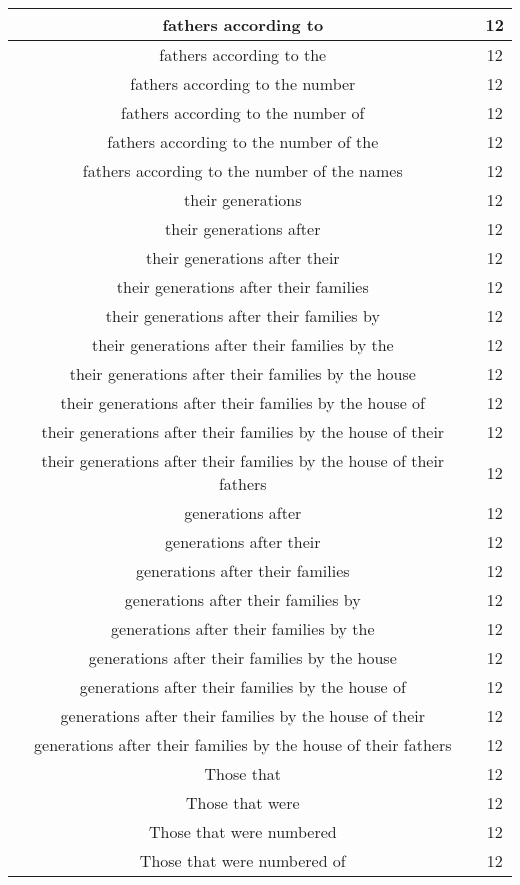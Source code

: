 \begin{center}
\begin{longtable}{|c|c|}
fathers according to & 12\\ \hline 
fathers according to the & 12\\ \hline 
fathers according to the number & 12\\ \hline 
fathers according to the number of & 12\\ \hline 
fathers according to the number of the & 12\\ \hline 
fathers according to the number of the names & 12\\ \hline 
their generations & 12\\ \hline 
their generations after & 12\\ \hline 
their generations after their & 12\\ \hline 
their generations after their families & 12\\ \hline 
their generations after their families by & 12\\ \hline 
their generations after their families by the & 12\\ \hline 
their generations after their families by the house & 12\\ \hline 
their generations after their families by the house of & 12\\ \hline 
their generations after their families by the house of their & 12\\ \hline 
their generations after their families by the house of their fathers & 12\\ \hline 
generations after & 12\\ \hline 
generations after their & 12\\ \hline 
generations after their families & 12\\ \hline 
generations after their families by & 12\\ \hline 
generations after their families by the & 12\\ \hline 
generations after their families by the house & 12\\ \hline 
generations after their families by the house of & 12\\ \hline 
generations after their families by the house of their & 12\\ \hline 
generations after their families by the house of their fathers & 12\\ \hline 
Those that & 12\\ \hline 
Those that were & 12\\ \hline 
Those that were numbered & 12\\ \hline 
Those that were numbered of & 12\\ \hline 

\end{longtable}
\end{center}
